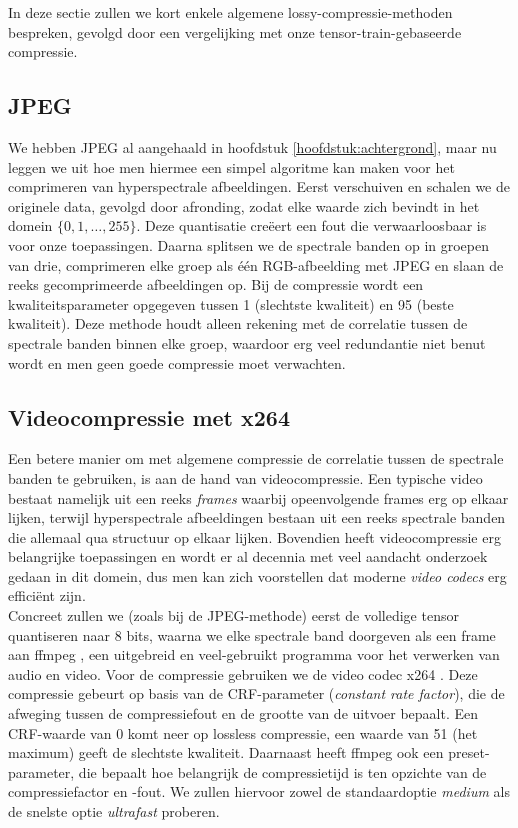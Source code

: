 In deze sectie zullen we kort enkele algemene lossy-compressie-methoden bespreken, gevolgd door een vergelijking met onze tensor-train-gebaseerde compressie.

\newpage
\subsection{JPEG}

We hebben JPEG \cite{ref:jpeg} al aangehaald in hoofdstuk \ref{hoofdstuk:achtergrond}, maar nu leggen we uit hoe men hiermee een simpel algoritme kan maken voor het comprimeren van hyperspectrale afbeeldingen. Eerst verschuiven en schalen we de originele data, gevolgd door afronding, zodat elke waarde zich bevindt in het domein $\{0, 1, \dots, 255\}$. Deze quantisatie cre\"eert een fout die verwaarloosbaar is voor onze toepassingen. Daarna splitsen we de spectrale banden op in groepen van drie, comprimeren elke groep als \'e\'en RGB-afbeelding met JPEG en slaan de reeks gecomprimeerde afbeeldingen op. Bij de compressie wordt een kwaliteitsparameter opgegeven tussen 1 (slechtste kwaliteit) en 95 (beste kwaliteit). Deze methode houdt alleen rekening met de correlatie tussen de spectrale banden binnen elke groep, waardoor erg veel redundantie niet benut wordt en men geen goede compressie moet verwachten.

\newpage
\subsection{Videocompressie met x264}

Een betere manier om met algemene compressie de correlatie tussen de spectrale banden te gebruiken, is aan de hand van videocompressie. Een typische video bestaat namelijk uit een reeks \textit{frames} waarbij opeenvolgende frames erg op elkaar lijken, terwijl hyperspectrale afbeeldingen bestaan uit een reeks spectrale banden die allemaal qua structuur op elkaar lijken. Bovendien heeft videocompressie erg belangrijke toepassingen en wordt er al decennia met veel aandacht onderzoek gedaan in dit domein, dus men kan zich voorstellen dat moderne \textit{video codecs} erg effici\"ent zijn.\\

Concreet zullen we (zoals bij de JPEG-methode) eerst de volledige tensor quantiseren naar 8 bits, waarna we elke spectrale band doorgeven als een frame aan ffmpeg \cite{ref:ffmpeg}, een uitgebreid en veel-gebruikt programma voor het verwerken van audio en video. Voor de compressie gebruiken we de video codec x264 \cite{ref:x264}. Deze compressie gebeurt op basis van de CRF-parameter (\textit{constant rate factor}), die de afweging tussen de compressiefout en de grootte van de uitvoer bepaalt. Een CRF-waarde van 0 komt neer op lossless compressie, een waarde van 51 (het maximum) geeft de slechtste kwaliteit. Daarnaast heeft ffmpeg ook een preset-parameter, die bepaalt hoe belangrijk de compressietijd is ten opzichte van de compressiefactor en -fout. We zullen hiervoor zowel de standaardoptie \textit{medium} als de snelste optie \textit{ultrafast} proberen.

